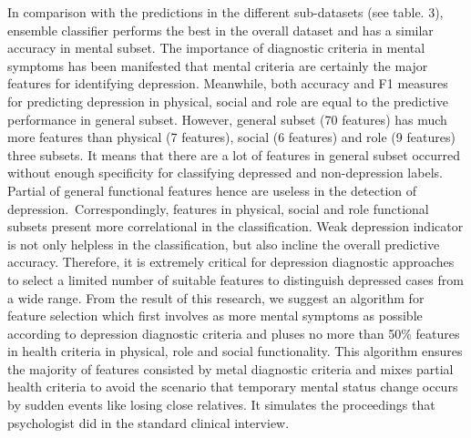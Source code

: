\documentclass[12pt]{article}
\begin{document}
In comparison with the predictions in the different sub-datasets (see table. 3), ensemble classifier performs the best in the overall dataset and has a similar accuracy in mental subset. The importance of diagnostic criteria in mental symptoms has been manifested that mental criteria are certainly the major features for identifying depression. Meanwhile, both accuracy and F1 measures for predicting depression in physical, social and role are equal to the predictive performance in general subset. However, general subset (70 features) has much more features than physical (7 features), social (6 features) and role (9 features) three subsets. It means that there are a lot of features in general subset occurred without enough specificity for classifying depressed and non-depression labels. Partial of general functional features hence are useless in the detection of depression. Correspondingly, features in physical, social and role functional subsets present more correlational in the classification. Weak depression indicator is not only helpless in the classification, but also incline the overall predictive accuracy. Therefore, it is extremely critical for depression diagnostic approaches to select a limited number of suitable features to distinguish depressed cases from a wide range. From the result of this research, we suggest an algorithm for feature selection which first involves as more mental symptoms as possible according to depression diagnostic criteria and pluses no more than 50\% features in health criteria in physical, role and social functionality. This algorithm ensures the majority of features consisted by metal diagnostic criteria and mixes partial health criteria to avoid the scenario that temporary mental status change occurs by sudden events like losing close relatives. It simulates the proceedings that psychologist did in the standard clinical interview. 
\\
\pagebreak
\end{document}
